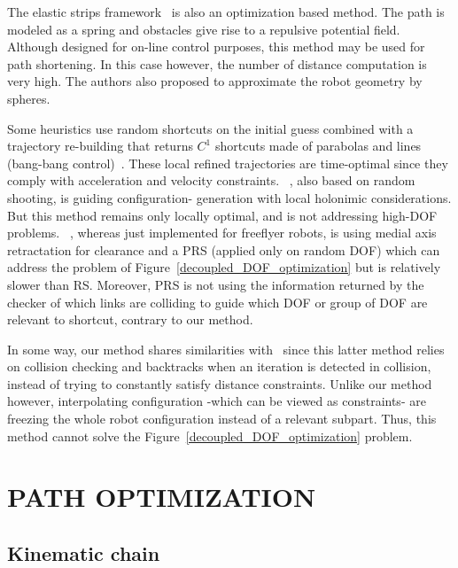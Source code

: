 \documentclass{tADR2e}
\begin{document}
The elastic strips framework~\cite{BrockElasticStrips} is also an optimization 
based method. The path is modeled as a spring and obstacles give rise to a 
repulsive potential field. Although designed for on-line control purposes, this 
method may be used for path shortening. In this case however, the number of 
distance computation is very high. The authors also proposed to approximate the 
robot geometry by spheres.

Some heuristics use random shortcuts on the initial guess combined with a 
trajectory re-building that returns ${C}^1$ shortcuts made of parabolas and lines 
(bang-bang control)~\cite{HauserFastSmooth}. These local refined trajectories 
are time-optimal since they comply with acceleration and velocity constraints. 
~\cite{Guernane2011}, also based on random shooting, is guiding configuration-
generation with local holonimic considerations. But this method remains only locally 
optimal, and is not addressing high-DOF problems.
~\cite{Geraerts04clearancebased}, whereas just implemented for freeflyer robots, is 
using medial axis retractation for clearance and a PRS (applied only on random DOF) 
which can address the problem of Figure~\ref{decoupled_DOF_optimization} but is 
relatively slower than RS. Moreover, PRS is not using the information returned by 
the checker of which links are colliding to guide which DOF or group of DOF are 
relevant to shortcut, contrary to our method.

In some way, our method shares similarities with~\cite{PanSmoothSplineShort} 
since this latter method relies on collision checking and backtracks when an 
iteration is detected in collision, instead of trying to constantly satisfy 
distance constraints. Unlike our method however, interpolating configuration -which 
can be viewed as constraints- are freezing the whole robot configuration instead of 
a relevant subpart. Thus, this method cannot solve the 
Figure~\ref{decoupled_DOF_optimization} problem.


\section{PATH OPTIMIZATION} \label{section:path_optim}

\subsection {Kinematic chain}
\end{document}
